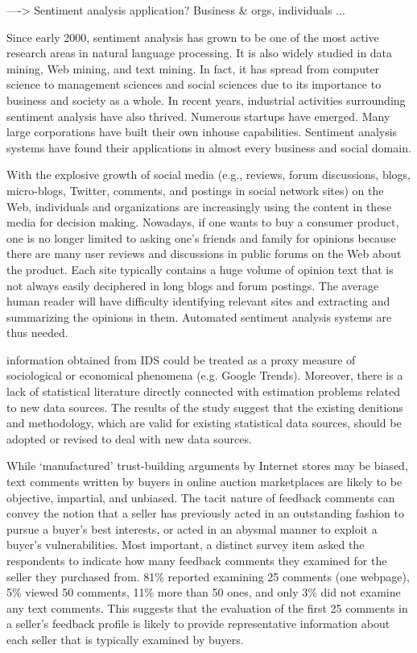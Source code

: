 \documentclass[a4paper, 11pt]{article}
\begin{document}
----> Sentiment analysis application? Business \& orgs, individuals ...

Since early 2000, sentiment analysis has grown to be one of the most
active research areas in natural language processing. It is also widely studied
in data mining, Web mining, and text mining. In fact, it has spread from
computer science to management sciences and social sciences due to its
importance to business and society as a whole. In recent years, industrial
activities surrounding sentiment analysis have also thrived. Numerous
startups have emerged. Many large corporations have built their own inhouse
capabilities. Sentiment analysis systems have found their applications
in almost every business and social domain.

With the explosive growth of social media (e.g., reviews, forum discussions,
blogs, micro-blogs, Twitter, comments, and postings in social network sites)
on the Web, individuals and organizations are increasingly using the content
in these media for decision making. Nowadays, if one wants to buy a
consumer product, one is no longer limited to asking one’s friends and
family for opinions because there are many user reviews and discussions in
public forums on the Web about the product. 
Each site
typically contains a huge volume of opinion text that is not always easily
deciphered in long blogs and forum postings. The average human reader will
have difficulty identifying relevant sites and extracting and summarizing the
opinions in them. Automated sentiment analysis systems are thus needed.\cite{liu2012sentiment}

information obtained from IDS
could be treated as a proxy measure of sociological or economical phenomena (e.g. Google
Trends). Moreover, there is a lack of statistical literature directly connected with estimation
problems related to new data sources. The results of the study suggest that the existing denitions and methodology, which are
valid for existing statistical data sources, should be adopted or revised to deal with new data
sources. \cite{berkesewicz2015representativeness}

While ‘manufactured’ trust-building arguments by Internet stores may be biased, text comments written by buyers in online auction marketplaces are likely to be objective, impartial, and unbiased. The tacit nature of feedback comments can convey the notion that a seller has previously acted in an outstanding fashion to pursue a buyer’s best interests, or acted in an abysmal manner to exploit a buyer’s vulnerabilities.
Most important, a distinct survey item asked the respondents to indicate how many feedback comments they examined for the seller they purchased from. 81\% reported examining 25 comments (one webpage), 5\% viewed 50 comments, 11\% more than 50 ones, and only 3\% did not examine any text comments. This suggests that the evaluation of the first 25 comments in a seller’s feedback profile is likely to provide representative information about each seller that is typically examined by buyers. \cite{pavlou2006institutional,pavlou2006nature} 
\end{document}
